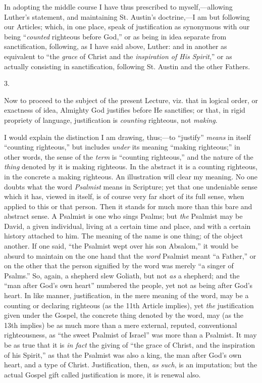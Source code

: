 In adopting the middle course I have thus prescribed to myself,—allowing
Luther's statement, and maintaining St. Austin's doctrine,—I am
but following our Articles; which, in one place, speak of
justification as synonymous with our being ``\emph{counted}
righteous before God,'' or as being in idea separate from
sanctification, following, as I have said above, Luther: and in
another as equivalent to ``the \emph{grace} of Christ and the \emph{inspiration
of His Spirit},'' or as actually consisting in sanctification,
following St. Austin and the other Fathers.

3.

Now to proceed to the subject of the present Lecture, viz. that in
logical order, or exactness of idea, Almighty God justifies before He
sanctifies; or that, in rigid propriety of language, justification is \emph{counting}
righteous, not \emph{making}.

I would explain the distinction I am drawing, thus;—to
``justify'' \emph{means} in itself ``counting
righteous,'' but includes \emph{under} its meaning ``making
righteous;'' in other words, the sense of the \emph{term} is
``counting righteous,'' and the nature of the \emph{thing}
denoted by it is making righteous. In the abstract it is a counting
righteous, in the concrete a making righteous. An illustration will
clear my meaning. No one doubts what the word \emph{Psalmist} means in
Scripture; yet that one undeniable sense which it has, viewed in
itself, is of course very far short of its full sense, when applied to
this or that person. Then it stands for much more than this bare and
abstract sense. A Psalmist is one who sings Psalms; but \emph{the}
Psalmist may be David, a given individual, living at a certain time
and place, and with a certain history attached to him. The meaning of
the name is one thing; of the object another. If one said,
``the Psalmist wept over his son Absalom,'' it would be absurd
to maintain on the one hand that the \emph{word} Psalmist meant
``a Father,'' or on the other that the person signified by the
word was merely ``a singer of Psalms.'' So, again, a shepherd
slew Goliath, but not \emph{as} a shepherd; and the ``man after
God's own heart'' numbered the people, yet not as being after
God's heart. In like manner, justification, in the mere meaning of the
word, may be a counting or declaring righteous (as the 11th Article
implies), yet \emph{the} justification given under the Gospel, the
concrete thing denoted by the word, may (as the 13th implies) be as
much more than a mere external, reputed, conventional righteousness,
as ``the sweet Psalmist of Israel'' was more than a Psalmist.
It may be as true that it is \emph{in fact} the giving of ``the
grace of Christ, and the inspiration of his Spirit,'' as that the
Psalmist was also a king, the man after God's own heart, and a type of
Christ. Justification, then, \emph{as such}, is an imputation; but the
actual Gospel gift called justification is more, it is renewal also.

